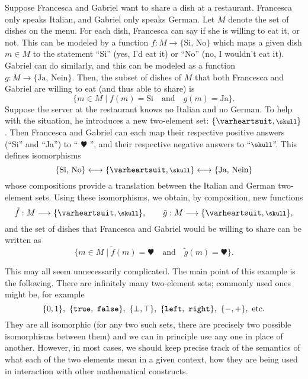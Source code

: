 \begin{example}
Suppose Francesca and Gabriel want to share a dish at a restaurant. Francesca only speaks Italian, and Gabriel only speaks German. Let $M$ denote the set of dishes on the menu. For each dish, Francesca can say if she is willing to eat it, or not. This can be modeled by a function $f: M \to \{ \text{Si, No} \}$ which maps a given dish $m \in M$ to the statement ``Si'' (yes, I'd eat it) or ``No'' (no, I wouldn't eat it). Gabriel can do similarly, and this can be modeled as a function $g: M \to \{ \text{Ja, Nein} \}$. 
Then, the subset of dishes of $M$ that both Francesca and Gabriel are willing to eat (and thus able to share) is
\begin{equation*}
\{ m \in M \mid f(m) = \text{Si} \quad \text{and} \quad g(m) = \text{Ja} \}. 
\end{equation*}
Suppose the server at the restaurant knows no Italian and no German. To help with the situation, he introduces a new two-element set: $\{ \varheartsuit, \mbox{\footnotesize $\skull$} \}$. Then Francesca and Gabriel can each map their respective positive answers (``Si'' and ``Ja'') to `` $\varheartsuit$ '', and their respective negative answers to ``$\mbox{\footnotesize $\skull$}$''. This defines isomorphisms 
\begin{equation*}
\{ \text{Si, No} \} \longleftrightarrow \{ \varheartsuit, \mbox{\footnotesize $\skull$} \} \longleftrightarrow \{ \text{Ja, Nein} \}
\end{equation*}
whose compositions provide a translation between the Italian and German two-element sets. Using these isomorphisms, we obtain, by composition, new functions 
\begin{equation*}
\tilde f:  M \longrightarrow \{ \varheartsuit, \mbox{\footnotesize $\skull$} \}, \qquad \tilde g: M \longrightarrow \{ \varheartsuit, \mbox{\footnotesize $\skull$} \},
\end{equation*}
and the set of dishes that Francesca and Gabriel would be willing to share can be written as
\begin{equation*}
\{ m \in M \mid \tilde f(m) = \varheartsuit \quad \text{and} \quad \tilde g(m) = \varheartsuit \}. 
\end{equation*}

This may all seem unnecessarily complicated. The main point of this example is the following. There are infinitely many two-element sets; commonly used ones might be, for example
\begin{equation*}
\{0, 1 \}, \ \{  \text{\tt true}, \text{ \tt false} \}, \ \{ \bot, \top \}, \ \{ \text{\tt left}, \text{ \tt right} \},  \ \{ -, + \}, \text{ etc.}
\end{equation*}
They are all isomorphic (for any two such sets, there are precisely two possible isomorphisms between them) and we can in principle use any one in place of another. However, in most cases, we should keep precise track of the semantics of what each of the two elements mean in a given context,  how they are being used in interaction with other mathematical constructs. 

\end{example}



